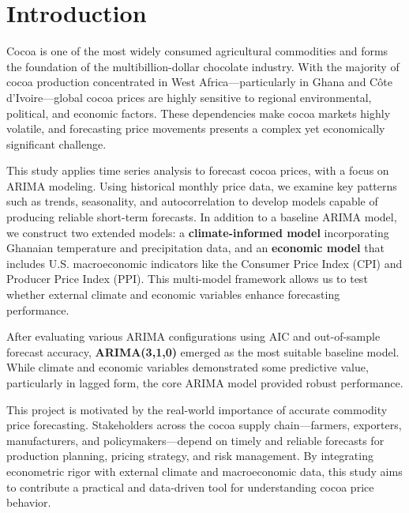 \chapter{Introduction}

Cocoa is one of the most widely consumed agricultural commodities and forms the foundation of the multibillion-dollar chocolate industry. With the majority of cocoa production concentrated in West Africa—particularly in Ghana and Côte d’Ivoire—global cocoa prices are highly sensitive to regional environmental, political, and economic factors. These dependencies make cocoa markets highly volatile, and forecasting price movements presents a complex yet economically significant challenge.

This study applies time series analysis to forecast cocoa prices, with a focus on ARIMA modeling. Using historical monthly price data, we examine key patterns such as trends, seasonality, and autocorrelation to develop models capable of producing reliable short-term forecasts. In addition to a baseline ARIMA model, we construct two extended models: a \textbf{climate-informed model} incorporating Ghanaian temperature and precipitation data, and an \textbf{economic model} that includes U.S. macroeconomic indicators like the Consumer Price Index (CPI) and Producer Price Index (PPI). This multi-model framework allows us to test whether external climate and economic variables enhance forecasting performance.

After evaluating various ARIMA configurations using AIC and out-of-sample forecast accuracy, \textbf{ARIMA(3,1,0)} emerged as the most suitable baseline model. While climate and economic variables demonstrated some predictive value, particularly in lagged form, the core ARIMA model provided robust performance.

This project is motivated by the real-world importance of accurate commodity price forecasting. Stakeholders across the cocoa supply chain—farmers, exporters, manufacturers, and policymakers—depend on timely and reliable forecasts for production planning, pricing strategy, and risk management. By integrating econometric rigor with external climate and macroeconomic data, this study aims to contribute a practical and data-driven tool for understanding cocoa price behavior.



